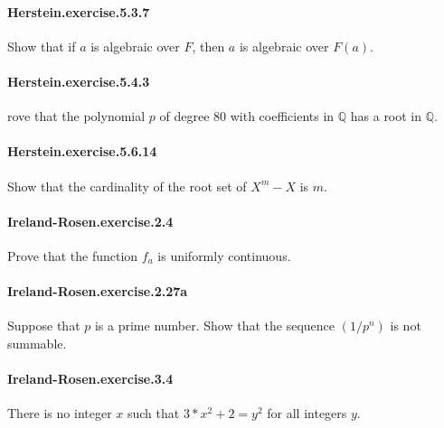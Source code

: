 \documentclass{article}
\begin{document}

\paragraph{Herstein.exercise.5.3.7} Show that if $a$ is algebraic over $F$, then $a$ is algebraic over $F(a)$.

\paragraph{Herstein.exercise.5.4.3} rove that the polynomial $p$ of degree $80$ with coefficients in $\mathbb{Q}$ has a root in $\mathbb{Q}$.

\paragraph{Herstein.exercise.5.6.14} Show that the cardinality of the root set of $X^m - X$ is $m$.


\paragraph{Ireland-Rosen.exercise.2.4} Prove that the function $f_a$ is uniformly continuous.

\paragraph{Ireland-Rosen.exercise.2.27a} Suppose that $p$ is a prime number. Show that the sequence $(1 / p^n)$ is not summable.

\paragraph{Ireland-Rosen.exercise.3.4} There is no integer $x$ such that $3*x^2 + 2 = y^2$ for all integers $y$.

\end{document}
